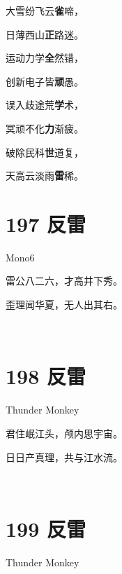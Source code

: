 \documentclass[UTF8,12pt,oneside]{ctexbook}
\begin{document}
        \begin{center}
        大雪纷飞云\textbf{雀}啼，
        
        日薄西山\textbf{正}路迷。
        
        运动力学\textbf{全}然错，
        
        创新电子皆\textbf{顽}愚。
        
        误入歧途荒\textbf{学}术，
        
        冥顽不化\textbf{力}渐疲。
        
        破除民科\textbf{世}道复，
        
        天高云淡雨\textbf{雷}稀。
        \end{center}

        \section{197 反雷}
        \begin{center}
            Mono6
        \end{center}
        
        \begin{center}
        雷公八二六，才高井下秀。

        歪理闻华夏，无人出其右。

        ~\\
        \end{center}

        \section{198 反雷}
        \begin{center}
            Thunder Monkey
        \end{center}
        
        \begin{center}
        君住岷江头，颅内思宇宙。
        
        日日产真理，共与江水流。

        ~\\
        \end{center}

        \section{199 反雷}
        \begin{center}
            Thunder Monkey
        \end{center}
        
\end{document}

